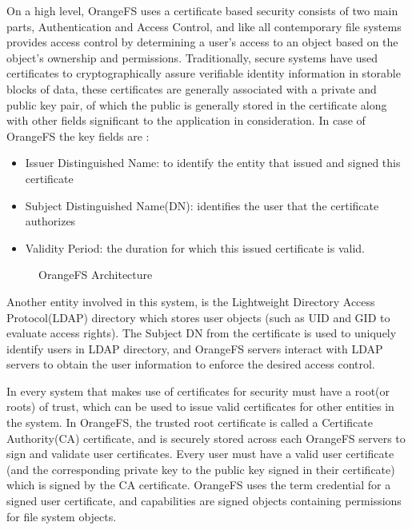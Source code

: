 On a high level, OrangeFS uses a certificate based security consists of two main parts, Authentication and Access Control, and like all contemporary file systems provides access control by determining a user's access to an object based on the object's ownership and permissions. Traditionally, secure systems have used certificates to cryptographically assure verifiable identity information in storable blocks of data, these certificates are generally associated with a private and public key pair, of which the public is generally stored in the certificate along with other fields significant to the application in consideration. In case of OrangeFS the key fields are :
\begin{itemize}
\item Issuer Distinguished Name: to identify the entity that issued and signed this certificate
\item Subject Distinguished Name(DN): identifies the user that the certificate authorizes
\item Validity Period: the duration for which this issued certificate is valid.
\end{itemize} 

\begin{figure}[h]
\centering
\caption{OrangeFS Architecture}
\label{fig:orange}
\end{figure}

Another entity involved in this system, is the Lightweight Directory Access Protocol(LDAP) directory which stores user objects (such as UID and GID to evaluate access rights). The Subject DN from the certificate is used to uniquely identify users in LDAP directory, and OrangeFS servers interact with LDAP servers to obtain the user information to enforce the desired access control. 

In every system that makes use of certificates for security must have a root(or roots) of trust, which can be used to issue valid certificates for other entities in the system. In OrangeFS, the trusted root certificate is called a Certificate Authority(CA) certificate, and is securely stored across each OrangeFS servers to sign and validate user certificates. Every user must have a valid user certificate (and the corresponding private key to the public key signed in their certificate) which is signed by the CA certificate. OrangeFS uses the term credential for a signed user certificate, and capabilities are signed objects containing permissions for file system objects.

